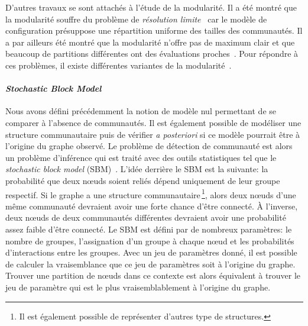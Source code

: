 D'autres travaux se sont attachés à l'étude de la modularité.
Il a été montré que la modularité souffre du problème de \emph{résolution limite}~\cite{Fortunato2007,Lancichinetti2011} car le modèle de configuration présuppose une répartition uniforme des tailles des communautés.
Il a par ailleurs été montré que la modularité n'offre pas de maximum clair et que beaucoup de partitions différentes ont des évaluations proches~\cite{Good2010}.
Pour répondre à ces problèmes, il existe différentes variantes de la modularité~\cite{Reichardt2006,Delvenne2010}.


\paragraph{\emph{Stochastic Block Model}}
Nous avons défini précédemment la notion de modèle nul permettant de se comparer à l'absence de communautés.
Il est également possible de modéliser une structure communautaire puis de vérifier \emph{a posteriori} si ce modèle pourrait être à l'origine du graphe observé.
Le problème de détection de communauté est alors un problème d'inférence qui est traité avec des outils statistiques tel que le \emph{stochastic block model} (SBM)~\cite{Holland1983a,Nowicki2001}.
L'idée derrière le SBM est la suivante: la probabilité que deux n\oe{}uds soient reliés dépend uniquement de leur groupe respectif.
Si le graphe a une structure communautaire\,\footnote{Il est également possible de représenter d'autres type de structures.}, alors deux n\oe{}uds d'une même communauté devraient avoir une forte chance d'être connecté.
\`A l'inverse, deux n\oe{}uds de deux communautés différentes devraient avoir une probabilité assez faible d'être connecté.
Le SBM est défini par de nombreux paramètres: le nombre de groupes, l'assignation d'un groupe à chaque n\oe{}ud et les probabilités d'interactions entre les groupes.
Avec un jeu de paramètres donné, il est possible de calculer la vraisemblance que ce jeu de paramètres soit à l'origine du graphe.
Trouver une partition de n\oe{}uds dans ce contexte est alors équivalent à trouver le jeu de paramètre qui est le plus vraisemblablement à l'origine du graphe.


